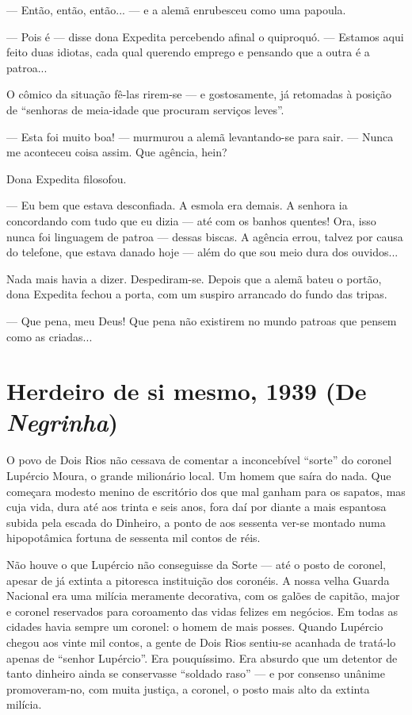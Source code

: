 --- Então, então, então... --- e a alemã enrubesceu como uma papoula.

--- Pois é --- disse dona Expedita percebendo afinal o quiproquó. ---
Estamos aqui feito duas idiotas, cada qual querendo emprego e pensando
que a outra é a patroa...

O cômico da situação fê-las rirem-se --- e gostosamente, já retomadas à
posição de ``senhoras de meia-idade que procuram serviços leves''.

--- Esta foi muito boa! --- murmurou a alemã levantando-se para sair.
--- Nunca me aconteceu coisa assim. Que agência, hein?

Dona Expedita filosofou.

--- Eu bem que estava desconfiada. A esmola era demais. A senhora ia
concordando com tudo que eu dizia --- até com os banhos quentes! Ora,
isso nunca foi linguagem de patroa --- dessas biscas. A agência errou,
talvez por causa do telefone, que estava danado hoje --- além do que sou
meio dura dos ouvidos...

Nada mais havia a dizer. Despediram-se. Depois que a alemã bateu o
portão, dona Expedita fechou a porta, com um suspiro arrancado do fundo
das tripas.

--- Que pena, meu Deus! Que pena não existirem no mundo patroas que
pensem como as criadas...

\chapter{Herdeiro de si mesmo, 1939 (De \emph{Negrinha})}

O povo de Dois Rios não cessava de comentar a inconcebível ``sorte'' do
coronel Lupércio Moura, o grande milionário local. Um homem que saíra do
nada. Que começara modesto menino de escritório dos que mal ganham para
os sapatos, mas cuja vida, dura até aos trinta e seis anos, fora daí por
diante a mais espantosa subida pela escada do Dinheiro, a ponto de aos
sessenta ver-se montado numa hipopotâmica fortuna de sessenta mil contos
de réis.

Não houve o que Lupércio não conseguisse da Sorte --- até o posto de
coronel, apesar de já extinta a pitoresca instituição dos coronéis. A
nossa velha Guarda Nacional era uma milícia meramente decorativa, com os
galões de capitão, major e coronel reservados para coroamento das vidas
felizes em negócios. Em todas as cidades havia sempre um coronel: o
homem de mais posses. Quando Lupércio chegou aos vinte mil contos, a
gente de Dois Rios sentiu-se acanhada de tratá-lo apenas de ``senhor
Lupércio''. Era pouquíssimo. Era absurdo que um detentor de tanto
dinheiro ainda se conservasse ``soldado raso'' --- e por consenso
unânime promoveram-no, com muita justiça, a coronel, o posto mais alto
da extinta milícia.

